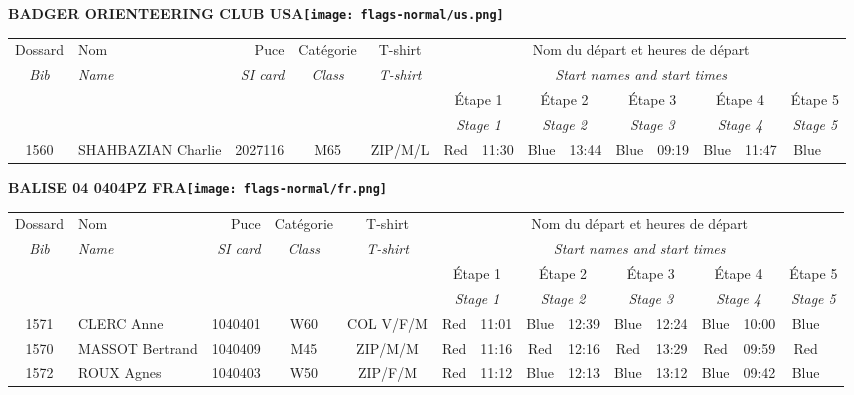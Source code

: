 \documentclass{report}
\begin{document}
\newpage
  \Huge \centering \bfseries BADGER ORIENTEERING CLUB  USA\normalfont \footnotesize \sffamily \hfill \texttt{[image: flags-normal/us.png]} \newline 
  \begin{longtable}{|c|l|r|c|c|*{5}{cc|}}
    Dossard & Nom  & Puce    & Catégorie & T-shirt & \multicolumn{10}{c|}{Nom du départ et heures de départ} \\
    \itshape Bib     & \itshape Name & \itshape SI card & \itshape Class  & \itshape  T-shirt  & \multicolumn{10}{c|}{\itshape Start names and start times} \\
    \hline
    & & & & & \multicolumn{2}{c|}{Étape 1} & \multicolumn{2}{c|}{Étape 2} & \multicolumn{2}{c|}{Étape 3} & \multicolumn{2}{c|}{Étape 4} & \multicolumn{2}{c|}{Étape 5} \\
    & & & & & \multicolumn{2}{c|}{\itshape Stage 1} & \multicolumn{2}{c|}{\itshape Stage 2} & \multicolumn{2}{c|}{\itshape Stage 3} & \multicolumn{2}{c|}{\itshape Stage 4} & \multicolumn{2}{c|}{\itshape Stage 5} \\
    \hline
    1560 & SHAHBAZIAN Charlie & 2027116 & M65 & ZIP/M/L & Red & 11:30 & Blue & 13:44 & Blue & 09:19 & Blue & 11:47 & Blue &  \\
  \end{longtable}
\newpage
  \Huge \centering \bfseries BALISE 04 0404PZ FRA\normalfont \footnotesize \sffamily \hfill \texttt{[image: flags-normal/fr.png]} \newline 
  \begin{longtable}{|c|l|r|c|c|*{5}{cc|}}
    Dossard & Nom  & Puce    & Catégorie & T-shirt & \multicolumn{10}{c|}{Nom du départ et heures de départ} \\
    \itshape Bib     & \itshape Name & \itshape SI card & \itshape Class  & \itshape  T-shirt  & \multicolumn{10}{c|}{\itshape Start names and start times} \\
    \hline
    & & & & & \multicolumn{2}{c|}{Étape 1} & \multicolumn{2}{c|}{Étape 2} & \multicolumn{2}{c|}{Étape 3} & \multicolumn{2}{c|}{Étape 4} & \multicolumn{2}{c|}{Étape 5} \\
    & & & & & \multicolumn{2}{c|}{\itshape Stage 1} & \multicolumn{2}{c|}{\itshape Stage 2} & \multicolumn{2}{c|}{\itshape Stage 3} & \multicolumn{2}{c|}{\itshape Stage 4} & \multicolumn{2}{c|}{\itshape Stage 5} \\
    \hline
    1571 & CLERC Anne & 1040401 & W60 & COL V/F/M & Red & 11:01 & Blue & 12:39 & Blue & 12:24 & Blue & 10:00 & Blue &  \\
    1570 & MASSOT Bertrand & 1040409 & M45 & ZIP/M/M & Red & 11:16 & Red & 12:16 & Red & 13:29 & Red & 09:59 & Red &  \\
    1572 & ROUX Agnes & 1040403 & W50 & ZIP/F/M & Red & 11:12 & Blue & 12:13 & Blue & 13:12 & Blue & 09:42 & Blue &  \\
  \end{longtable}
\end{document}
